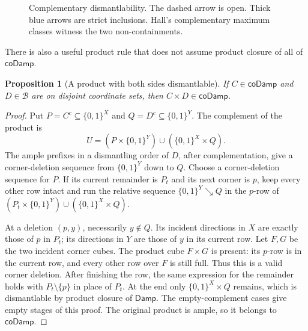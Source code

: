 \documentclass[11pt]{article}
\newtheorem{proposition}{Proposition}[section]
\theoremstyle{definition}
\newcommand{\bits}{\{0,1\}}
\newcommand{\Amp}{\mathsf{Amp}}
\newcommand{\Damp}{\mathsf{Damp}}
\newcommand{\Rep}{\mathsf{Rep}}
\begin{document}
\begin{figure}[ht]
\centering
{}
\caption{Complementary dismantlability. The dashed arrow is open.
Thick blue arrows are strict inclusions. Hall's complementary maximum
classes witness the two non-containments.}
\label{fig:complement-dismantlable}
\end{figure}

There is also a useful product rule that does not assume product closure
of all of $\mathsf{coDamp}$.
\begin{proposition}[A product with both sides dismantlable]
\label{prop:complement-dismantlable-product}
If $C\in\mathsf{coDamp}$ and $D\in\mathcal B$ are on disjoint
coordinate sets, then $C\times D\in\mathsf{coDamp}$.
\end{proposition}
\begin{proof}
Put $P=C^c\subseteq\bits^X$ and $Q=D^c\subseteq\bits^Y$. The
complement of the product is
\[
 U=(P\times\bits^Y)\cup(\bits^X\times Q).
\]
The ample prefixes in a dismantling order of $D$, after complementation,
give a corner-deletion sequence from $\bits^Y$ down to $Q$. Choose a
corner-deletion sequence for $P$. If its current remainder is $P_t$ and
its next corner is $p$, keep every other row intact and run the relative
sequence $\bits^Y\searrow Q$ in the $p$-row of
$(P_t\times\bits^Y)\cup(\bits^X\times Q)$.

At a deletion $(p,y)$, necessarily $y\notin Q$. Its incident directions
in $X$ are exactly those of $p$ in $P_t$; its directions in $Y$ are those
of $y$ in its current row. Let $F,G$ be the two incident corner cubes.
The product cube $F\times G$ is present: its $p$-row is in the current
row, and every other row over $F$ is still full. Thus this is a valid
corner deletion. After finishing the row, the same expression for the
remainder holds with $P_t\setminus\{p\}$ in place of $P_t$. At the end
only $\bits^X\times Q$ remains, which is dismantlable by product closure
of $\Damp$. The empty-complement cases give empty stages of this proof.
The original product is ample, so it belongs to $\mathsf{coDamp}$.
\end{proof}
\end{document}
